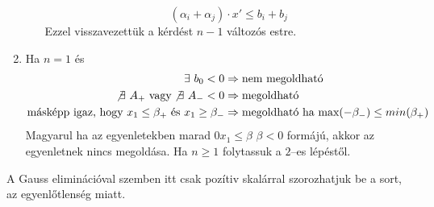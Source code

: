 \begin{enumerate}
\begin{itemize}
  	\[
  	\left( \alpha_i + \alpha_j \right) \cdot x' \leq b_i + b_j 
  	\]
  	Ezzel visszavezettük a kérdést $n-1$ változós estre.
  \end{itemize}
 \item Ha $n=1$ és 
 \begin{align*}
 \exists~b_0 < 0 &\Rightarrow \mbox{nem megoldható} \\
 \not \exists~A_+ \mbox{ vagy} \not \exists~A_- < 0 &\Rightarrow \mbox{megoldható} \\
 \mbox{másképp igaz, hogy } x_1 \leq \beta_+ \mbox{ és } x_1 \geq \beta_-
 &\Rightarrow \mbox{megoldható ha } \mbox{max}(-\beta_-) \leq min(\beta_+)
 \end{align*} 
 Magyarul ha az egyenletekben marad $0 x_1 \leq \beta$ $\beta < 0$ formájú,
  akkor az egyenletnek nincs megoldása.
 Ha $n \geq 1$ folytassuk a $2$--es lépéstől.
\end{enumerate} 

A Gauss eliminációval szemben itt csak pozítiv skalárral szorozhatjuk be a sort,
az egyenlőtlenség miatt.